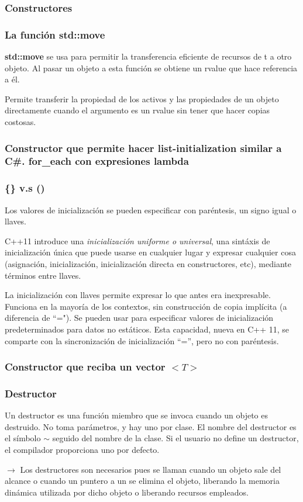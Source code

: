 \documentclass{beamer}
\begin{document}
	\begin{frame}
		\frametitle{Constructores}
		
	\end{frame}
	
	\begin{frame}
		\frametitle{La funci\'on std::move}
		\textbf{std::move} se usa para permitir la transferencia eficiente de recursos de t a otro objeto. Al pasar un objeto a esta función se obtiene un rvalue que hace referencia a él. 
		
		Permite transferir la propiedad de los activos y las propiedades de un objeto directamente cuando el argumento es un rvalue sin tener que hacer copias costosas.
	\end{frame}

	\begin{frame}
		\frametitle{Constructor que permite hacer list-initialization similar a C\#. for\_each con expresiones lambda}
	
	\end{frame}

	\begin{frame}
		\frametitle{\{\} v.s ()}
		Los valores de inicialización se pueden especificar con paréntesis, un signo igual o llaves.
		
		C++11 introduce una \textit{inicialización uniforme o universal}, una sint\'axis de inicialización única que puede usarse en cualquier lugar y expresar cualquier cosa (asignación, inicialización, inicialización directa en constructores, etc), mediante t\'erminos entre llaves.
		
		La inicialización con llaves permite expresar lo que antes era inexpresable. Funciona en la mayoría de los contextos, sin construcción de copia implícita (a diferencia de ``="). Se pueden usar para especificar valores de inicialización predeterminados para datos no estáticos. Esta capacidad, nueva en C++ 11, se comparte con la sincronización de inicialización “=”, pero no con paréntesis.
	\end{frame}

	\begin{frame}
		\frametitle{Constructor que reciba un vector $ <T> $}
			
	\end{frame}

	\begin{frame}
		\frametitle{Destructor}
		Un destructor es una función miembro que se invoca cuando un objeto es destruido. No toma parámetros, y hay uno por clase. El nombre del destructor es el s\'imbolo $ \sim $ seguido del nombre de la clase. Si el usuario no define un destructor, el compilador proporciona uno por defecto.
		
		$\rightarrow$ Los destructores son necesarios pues se llaman cuando un objeto sale del alcance o cuando un puntero a un se elimina el objeto, liberando la memoria dinámica utilizada por dicho objeto o liberando recursos empleados. 
	\end{frame}
	
\end{document}
